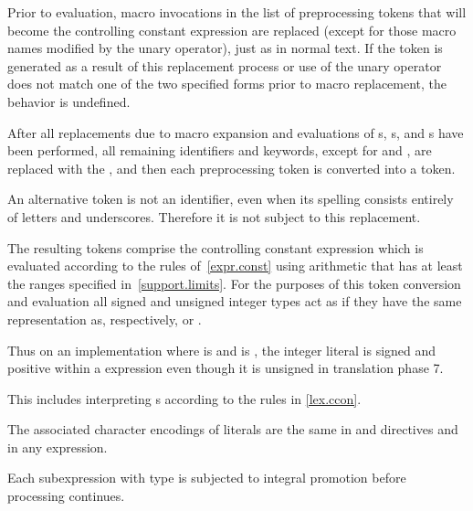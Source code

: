 \pnum
Prior to evaluation,
macro invocations in the list of preprocessing tokens
that will become the controlling constant expression
are replaced
(except for those macro names modified by the
unary operator),
just as in normal text.
If the token
is generated as a result of this replacement process
or use of the
unary operator does not match one of the two specified forms
prior to macro replacement,
the behavior is undefined.

\pnum
After all replacements due to macro expansion and
evaluations of
s,
s, and
s
have been performed,
all remaining identifiers and keywords,
except for
and
,
are replaced with the 
,
and then each preprocessing token is converted into a token.
\begin{note}
An alternative
token is not an identifier,
even when its spelling consists entirely of letters and underscores.
Therefore it is not subject to this replacement.
\end{note}

\pnum
The resulting tokens comprise the controlling constant expression
which is evaluated according to the rules of~\ref{expr.const}
using arithmetic that has at least the ranges specified
in~\ref{support.limits}. For the purposes of this token conversion and evaluation
all signed and unsigned integer types
act as if they have the same representation as, respectively,
 or .
\begin{note}
Thus on an
implementation where  is 
and  is ,
the integer literal  is signed and positive within a 
expression even though it is unsigned in translation phase
7.
\end{note}
This includes interpreting s
according to the rules in \ref{lex.ccon}.
\begin{note}
The associated character encodings of literals are the same
in  and  directives and in any expression.
\end{note}
Each subexpression with type
is subjected to integral promotion before processing continues.

